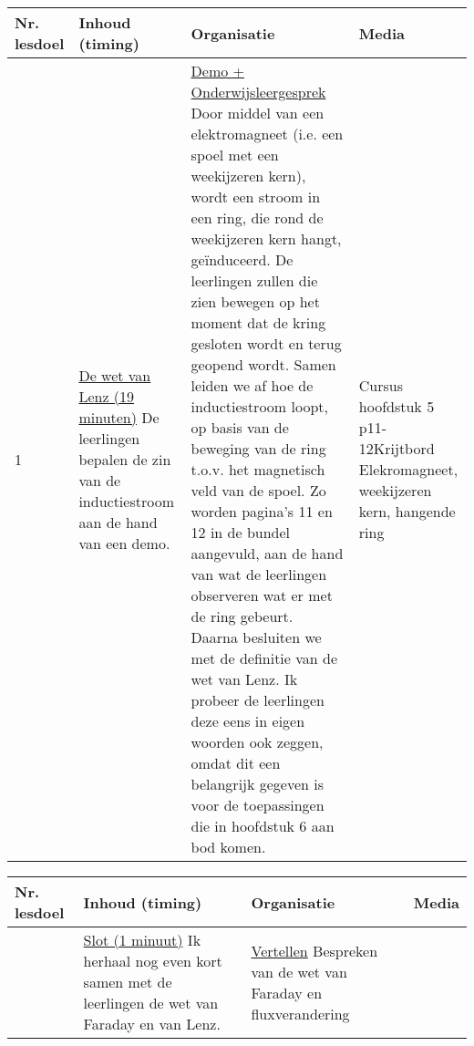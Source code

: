 \begin{landscape}
\begin{tabularx}{1.56\textwidth}{|p{1.5cm}|p{8cm}|X|p{4cm}|}
	\hline
	\textbf{Nr. lesdoel } & \textbf{Inhoud (timing)}  & \textbf{Organisatie } & \textbf{Media } \\ \hline
	1\newline\newline 2&\underline{De wet van Lenz (19 minuten)}\newline
	De leerlingen bepalen de zin van de inductiestroom  aan de hand van een demo.
	&  \underline{Demo + Onderwijsleergesprek}\newline 
	Door middel van een elektromagneet (i.e. een spoel met een weekijzeren kern), wordt een stroom  in een ring, die rond de weekijzeren kern hangt, geïnduceerd. De leerlingen zullen die zien bewegen op het moment dat de kring gesloten wordt en terug geopend wordt. Samen leiden we af hoe de inductiestroom loopt, op basis van de beweging van de ring t.o.v. het magnetisch veld van de spoel. Zo worden pagina's 11 en 12 in de bundel aangevuld, aan de hand van wat de leerlingen observeren wat er met de ring gebeurt. Daarna besluiten we met de definitie van de wet van Lenz. Ik probeer de leerlingen deze eens in eigen woorden ook zeggen, omdat dit een belangrijk gegeven is voor de toepassingen die in hoofdstuk 6 aan bod komen. 
	&   Cursus hoofdstuk 5 p11-12\newline\newline Krijtbord \newline\newline Elekromagneet, weekijzeren kern, hangende ring
	\\ \hline
\end{tabularx}\vspace{5mm}

\begin{tabularx}{1.56\textwidth}{|p{1.5cm}|p{9cm}|X|p{4cm}|}
	\hline
	\textbf{Nr. lesdoel } & \textbf{Inhoud (timing)}  & \textbf{Organisatie } & \textbf{Media } \\ \hline
	& \underline{Slot (1 minuut)}\newline
	Ik herhaal nog even kort samen met de leerlingen de wet van Faraday en van Lenz. 
	&  \underline{Vertellen}\newline 
	Bespreken van de wet van Faraday en fluxverandering
	&  
	\\ \hline
\end{tabularx}




	
\end{landscape}


